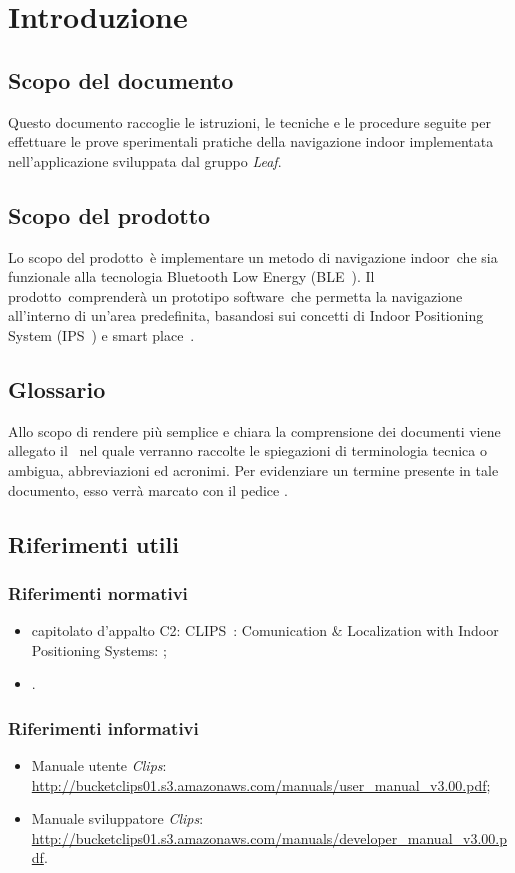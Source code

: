 \documentclass[../Sperimentazioni.tex]{subfiles}
\begin{document}
\section{Introduzione}

	\subsection{Scopo del documento}
		Questo documento raccoglie le istruzioni, le tecniche e le procedure seguite per effettuare le prove sperimentali pratiche della navigazione indoor implementata nell'applicazione sviluppata dal gruppo \textit{Leaf}.
	
	\subsection{Scopo del prodotto}
		Lo scopo del prodotto\g\ è implementare un metodo di navigazione indoor\g\ che sia funzionale alla tecnologia Bluetooth Low Energy (BLE\g\ ). Il prodotto\g\ comprenderà un prototipo software\g\ che permetta la navigazione all'interno di un'area predefinita, basandosi sui concetti di Indoor Positioning System (IPS\g\ ) e smart place\g\ .
	
	\subsection{Glossario} \label{sec:Glossario}
	Allo scopo di rendere più semplice e chiara la comprensione dei documenti viene allegato il \glossariov\ nel quale verranno raccolte le spiegazioni di  terminologia tecnica o  ambigua, abbreviazioni ed acronimi. Per evidenziare un termine presente in tale documento, esso verrà marcato con il pedice \g .
	
	
	\subsection{Riferimenti utili}
	
		\subsubsection{Riferimenti normativi}
		\begin{itemize}
			\item capitolato d'appalto C2: CLIPS\g\ : Comunication \& Localization with Indoor Positioning Systems:
			;
			\item \normediprogettov.
		\end{itemize}
		
		\subsubsection{Riferimenti informativi}
		\begin{itemize}
			\item Manuale utente \textit{Clips}: \url{http://bucketclips01.s3.amazonaws.com/manuals/user_manual_v3.00.pdf};
			\item Manuale sviluppatore \textit{Clips}: \url{http://bucketclips01.s3.amazonaws.com/manuals/developer_manual_v3.00.pdf}.
		\end{itemize}
		
\end{document}
